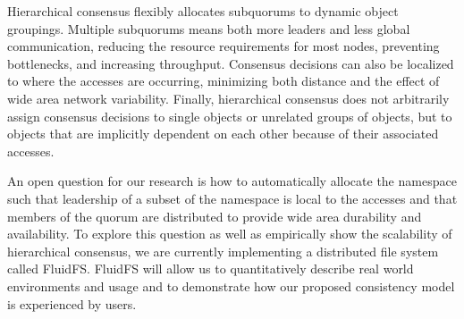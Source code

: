 \documentclass[sigconf]{acmart}
\begin{document}
Hierarchical consensus flexibly allocates subquorums to dynamic object groupings.
Multiple subquorums means both more leaders and less global communication, reducing the
resource requirements for most nodes, preventing bottlenecks, and increasing throughput.
Consensus decisions can also be localized to where the accesses are occurring,
minimizing both distance and the effect of wide area network variability.
Finally, hierarchical consensus does not arbitrarily assign consensus decisions to single
objects or unrelated groups of objects, but to objects that are implicitly dependent on
each other because of their associated accesses.

An open question for our research is how to automatically allocate the namespace such that
leadership of a subset of the namespace is local to the accesses and that members of the
quorum are distributed to provide wide area durability and availability.
To explore this question as well as empirically show the scalability of hierarchical
consensus, we are currently implementing a distributed file system called FluidFS.
FluidFS will allow us to quantitatively describe real world environments and usage and
to demonstrate how our proposed consistency model is experienced by users.



\end{document}
